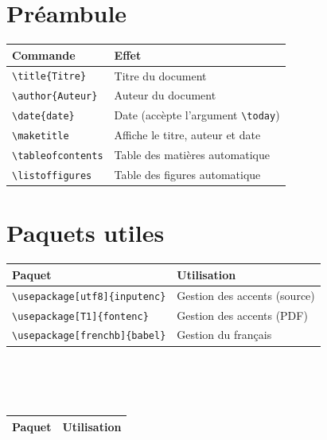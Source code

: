 \documentclass{article}
\begin{document}
\begin{multicols}{2}
\section*{Préambule}
\begin{tabular}{|l|l|}
	\arrayrulecolor{LightGray}
	\rowcolor{LightGray} Commande & Effet\\\hline
	\verb!\title{Titre}! & Titre du document \\\hline
	\verb!\author{Auteur}! & Auteur du document \\\hline
	\verb!\date{date}! & Date (accèpte l'argument \verb!\today!)\\\hline
	\verb!\maketitle! & Affiche le titre, auteur et date\\\hline
	\verb!\tableofcontents! & Table des matières automatique\\\hline
	\verb!\listoffigures! & Table des figures automatique\\\hline
\end{tabular}


\section*{Paquets utiles}
\begin{tabular}{|l|l|}
	\arrayrulecolor{LightGray}\hline
	\rowcolor{LightGray} Paquet & Utilisation\\\hline
	\verb!\usepackage[utf8]{inputenc}! & Gestion des accents (source)\\\hline
	\verb!\usepackage[T1]{fontenc}! & Gestion des accents (PDF)\\\hline
	\verb!\usepackage[frenchb]{babel}! & Gestion du français\\\hline
\end{tabular}
\ \\\ \\\ \\
\begin{tabular}{|l|l|}
	\arrayrulecolor{LightGray}\hline
	\rowcolor{LightGray} Paquet & Utilisation\\\hline


\end{tabular}
\end{multicols}
\end{document}
